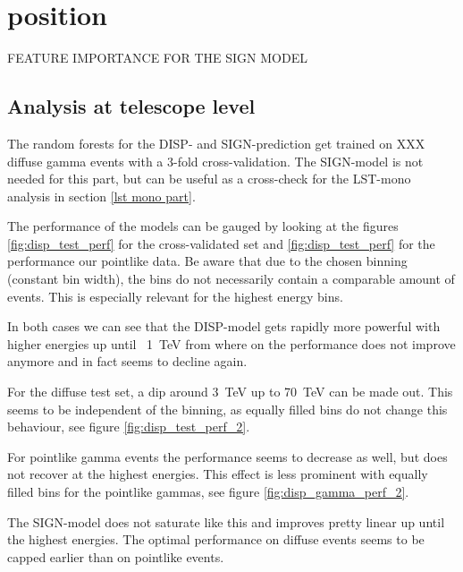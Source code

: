 \section{position}\label{position}

FEATURE IMPORTANCE FOR THE SIGN MODEL

\subsection{Analysis at telescope level}

The random forests for the DISP- and SIGN-prediction get trained on
XXX diffuse gamma events with a 3-fold cross-validation.
The SIGN-model is not needed for this part, but can be useful as 
a cross-check for the LST-mono analysis in section \ref{lst mono part}.

The performance of the models can be gauged by looking at the 
figures \ref{fig:disp_test_perf} for the cross-validated set and 
\ref{fig:disp_test_perf} for the performance our 
pointlike data. Be aware that due to the chosen binning (constant bin width),
the bins do not necessarily contain a comparable amount of events.
This is especially relevant for the highest energy bins.

In both cases we can see that the DISP-model gets rapidly more
powerful with higher energies up until ~\SI{1}{\tera\electronvolt} from 
where on the performance does not improve anymore and in fact seems to decline
again. 

For the diffuse test set, a dip around \SI{3}{\tera\electronvolt}
up to \SI{70}{\tera\electronvolt} can be made out.
This seems to be independent of the binning, as equally filled bins 
do not change this behaviour, see figure \ref{fig:disp_test_perf_2}.

For pointlike gamma events the performance seems to decrease as well, but does not 
recover at the highest energies.
This effect is less prominent with equally filled bins for the pointlike
gammas, see figure \ref{fig:disp_gamma_perf_2}.

The SIGN-model does not saturate like this and improves pretty linear up until
the highest energies. The optimal performance on diffuse events seems 
to be capped earlier than on pointlike events.

